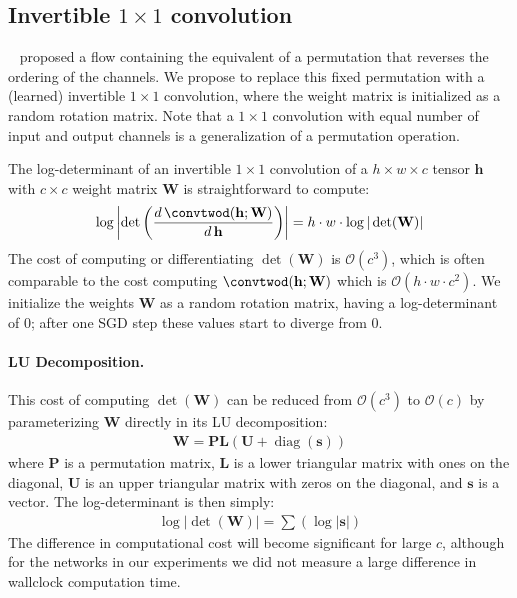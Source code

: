 \documentclass{article}
\newcommand{\bb}[1]{\mathbf{#1}}
\newcommand{\bW}{\bb{W}}
\newcommand{\bh}{\bb{h}}
\newcommand{\bs}{\mathbf{s}}
\begin{document}
\subsection{Invertible $1 \times 1$ convolution}
\label{sec:invconv}

~\citep{dinh2014nice,dinh2016density} proposed a flow containing the equivalent of a permutation that reverses the ordering of the channels. We propose to replace this fixed permutation with a (learned) invertible $1 \times 1$ convolution, where the weight matrix is initialized as a random rotation matrix. Note that a $1 \times 1$ convolution with equal number of input and output channels is a generalization of a permutation operation.

The log-determinant of an invertible $1 \times 1$ convolution of a $h \times w \times c$ tensor $\bh$ with $c \times c$ weight matrix $\bW$ is straightforward to compute:
\begin{align}
    \log \left| \det \left(\frac{d\,\convtwod(\bh; \bW)}{d\, \bh} \right) \right| = h \cdot w \cdot \log | \det(\bW) |
\end{align}
The cost of computing or differentiating $\det(\bW)$ is $\mathcal{O}(c^3)$, which is often comparable to the cost computing $\convtwod(\bh; \bW)$ which is $\mathcal{O}(h \cdot w \cdot c^2)$. We initialize the weights $\bW$ as a random rotation matrix, having a log-determinant of 0; after one SGD step these values start to diverge from 0.

\paragraph{LU Decomposition.} This cost of computing $\det(\bW)$ can be reduced from $\mathcal{O}(c^3)$ to $\mathcal{O}(c)$ by parameterizing $\bW$ directly in its LU decomposition:
\begin{align}
    \bW = \mathbf{P} \mathbf{L} (\mathbf{U} + \operatorname{diag}(\bs))
\label{eq:lu}\end{align}
where $\mathbf{P}$ is a permutation matrix, $\mathbf{L}$ is a lower triangular matrix with ones on the diagonal, $\mathbf{U}$ is an upper triangular matrix with zeros on the diagonal, and $\bs$ is a vector. The log-determinant is then simply:
\begin{align}
\log | \det(\bW) | = \sum(\log|\bs|)
\end{align}
The difference in computational cost will become significant for large $c$, although for the networks in our experiments we did not measure a large difference in wallclock computation time.
\end{document}
